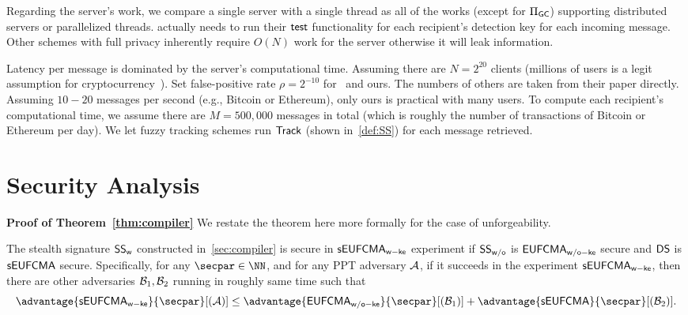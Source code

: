 Regarding the server's work, we compare a single server with a single thread as all of the works (except for $\Pi_{\mathsf{GC}}$) supporting distributed servers or parallelized threads. \cite{CCS:BLMG21} actually needs to run their $\mathsf{test}$ functionality for each recipient's detection key for each incoming message. Other schemes with full privacy inherently require $O(N)$ work for the server otherwise it will leak information.

Latency per message is dominated by the server's computational time. Assuming there are $N=2^{20}$ clients (millions of users is a legit assumption for cryptocurrency~\cite{users}). Set false-positive rate $\rho=2^{-10}$ for~\cite{CCS:BLMG21} and ours. The numbers of others are taken from their paper directly. Assuming $10-20$ messages per second (e.g., Bitcoin or Ethereum), only ours is practical with many users.
To compute each recipient's computational time, we assume there are $M=500,000$ messages in total (which is roughly the number of transactions of Bitcoin or Ethereum per day). We let fuzzy tracking schemes run $\mathsf{Track}$ (shown in~\cref{def:SS}) for each message retrieved.




\section{Security Analysis}\label{sec:compiler_proof}
\noindent\textbf{Proof of Theorem~\ref{thm:compiler}}
We restate the theorem here more formally for the case of unforgeability.
\begin{theorem}
\label{thm:compiler-unforge}
The stealth signature $\mathsf{SS}_\mathsf{w}$ constructed in~\cref{sec:compiler} is secure in $\mathsf{sEUFCMA}_\mathsf{w-ke}$ experiment if $\mathsf{SS}_\mathsf{w/o}$ is $\mathsf{EUFCMA}_\mathsf{w/o-ke}$ secure and $\mathsf{DS}$ is $\mathsf{sEUFCMA}$ secure. Specifically, for any $\secpar\in\NN$, and for any PPT adversary $\mathcal{A}$, if it succeeds in the experiment $\mathsf{sEUFCMA}_\mathsf{w-ke}$, then there are other adversaries $\mathcal{B}_1,\mathcal{B}_2$ running in roughly same time such that$$
\advantage{\seufcmawke}{\secpar}[(\Ac)] \le \advantage{\eufcmawoke}{\secpar}[(\Bc_1)] + \advantage{\seufcma}{\secpar}[(\Bc_2)].
$$
\end{theorem}


